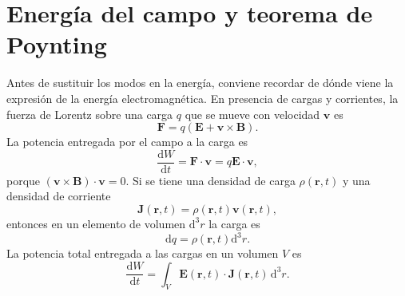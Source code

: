 \documentclass[11pt]{article}
\newcommand{\dd}{\mathrm{d}}
\newcommand{\vb}[1]{\mathbf{#1}}
\begin{document}
\section{Energ\'ia del campo y teorema de Poynting}

Antes de sustituir los modos en la energ\'ia, conviene recordar de d\'onde
viene la expresi\'on de la energ\'ia electromagn\'etica. En presencia de cargas
y corrientes, la fuerza de Lorentz sobre una carga $q$ que se mueve con
velocidad $\vb v$ es
\begin{equation}
  \vb F=q(\vb E+\vb v\times\vb B).
\end{equation}
La potencia entregada por el campo a la carga es
\begin{equation}
  \frac{\dd W}{\dd t}
  =
  \vb F\cdot\vb v
  =
  q\vb E\cdot\vb v,
\end{equation}
porque $(\vb v\times\vb B)\cdot\vb v=0$. Si se tiene una densidad de carga
$\rho(\vb r,t)$ y una densidad de corriente
\begin{equation}
  \vb J(\vb r,t)=\rho(\vb r,t)\vb v(\vb r,t),
\end{equation}
entonces en un elemento de volumen $\dd^3r$ la carga es
\begin{equation}
  \dd q=\rho(\vb r,t)\dd^3r.
\end{equation}
La potencia total entregada a las cargas en un volumen $V$ es
\begin{equation}
  \frac{\dd W}{\dd t}
  =
  \int_V \vb E(\vb r,t)\cdot\vb J(\vb r,t)\,\dd^3r.
\end{equation}
\end{document}
